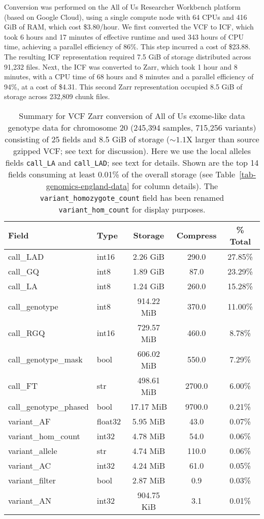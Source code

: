\documentclass[a4paper,num-refs]{oup-contemporary}
\begin{document}
Conversion was performed on the All of Us Researcher Workbench platform
(based on Google Cloud), using a single compute node with 64 CPUs and 416 GiB
of RAM, which cost \$3.80/hour. We first converted the VCF to  ICF, which
took 6 hours and 17 minutes of effective runtime and used 343 hours of CPU
time, achieving a parallel efficiency of 86\%. This step incurred a cost of
\$23.88. The resulting ICF representation required 7.5 GiB of storage distributed
across 91,232 files. Next, the ICF was converted to Zarr, which took 1 hour and 8 minutes, with
a CPU time of 68 hours and 8 minutes and a parallel efficiency of 94\%, at a
cost of \$4.31. This second Zarr representation occupied 8.5 GiB of storage across
232,809 chunk files.

\begin{table}
\caption{Summary for VCF Zarr conversion of 
All of Us exome-like data genotype data for chromosome 20 (245,394 samples, 
715,256 variants) 
consisting of 25 fields and 8.5 GiB of storage ($\sim1.1$X larger
than source gzipped VCF; see text for discussion).
Here we use the local alleles fields \texttt{call\_LA} and \texttt{call\_LAD}; 
see text for details.
Shown are the top 14 fields consuming at least 0.01\% of the 
overall storage (see Table~\ref{tab-genomics-england-data} for column details).
The \texttt{variant\_homozygote\_count} field has been renamed 
\texttt{variant\_hom\_count} for display purposes.
\label{tab-aou-data}}
\begin{tabular}{llS[table-format=3.2]S[table-format=4.1]S[table-format=3.2]}
\toprule
{Field} & {Type} & {Storage} & {Compress} & {\% Total} \\
\midrule
call\_LAD & int16 & 2.26 GiB & 290.0 & 27.85\% \\
call\_GQ & int8 & 1.89 GiB & 87.0 & 23.29\% \\
call\_LA & int8 & 1.24 GiB & 260.0 & 15.28\% \\
call\_genotype & int8 & 914.22 MiB & 370.0 & 11.00\% \\
call\_RGQ & int16 & 729.57 MiB & 460.0 & 8.78\% \\
call\_genotype\_mask & bool & 606.02 MiB & 550.0 & 7.29\% \\
call\_FT & str & 498.61 MiB & 2700.0 & 6.00\% \\
call\_genotype\_phased & bool & 17.17 MiB & 9700.0 & 0.21\% \\
variant\_AF & float32 & 5.95 MiB & 43.0 & 0.07\% \\
variant\_hom\_count & int32 & 4.78 MiB & 54.0 & 0.06\% \\
variant\_allele & str & 4.74 MiB & 110.0 & 0.06\% \\
variant\_AC & int32 & 4.24 MiB & 61.0 & 0.05\% \\
variant\_filter & bool & 2.87 MiB & 0.9 & 0.03\% \\
variant\_AN & int32 & 904.75 KiB & 3.1 & 0.01\% \\
\bottomrule
\end{tabular}
\end{table}
\end{document}
